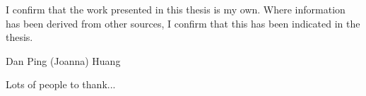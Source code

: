 \begin{declaration}
  I confirm that the work presented in this thesis is my own. Where information has been derived from other sources, I confirm that this has been indicated in the thesis.
  \vspace*{1cm}
  \begin{flushright}
    Dan Ping (Joanna) Huang
  \end{flushright}
\end{declaration}


\begin{acknowledgements}
  Lots of people to thank...
\end{acknowledgements}

\tableofcontents


